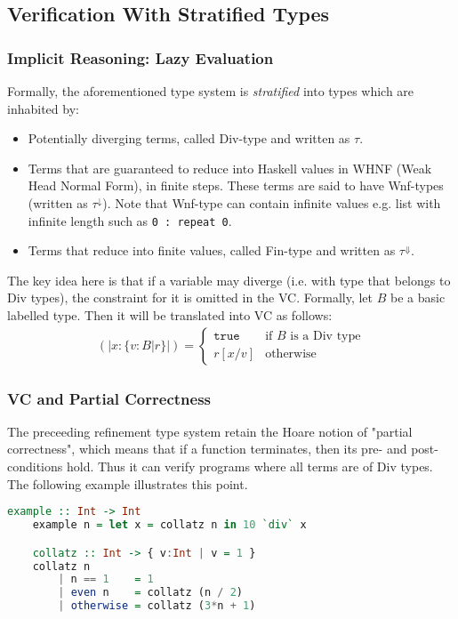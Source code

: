 \documentclass[a4paper,UKenglish]{lipics-v2016}
\begin{document}
\subsection{Verification With Stratified Types}
\subsubsection{Implicit Reasoning: Lazy Evaluation}
Formally, the aforementioned type system is \emph{stratified} into types which
are inhabited by:
\begin{itemize}
    \item Potentially diverging terms, called Div-type and written as $\tau$.
    \item Terms that are guaranteed to reduce into Haskell values in WHNF (Weak
        Head Normal Form), in finite steps.  These terms are said to have
        Wnf-types (written as $\tau^{\downarrow}$).  Note that Wnf-type can
        contain infinite values e.g. list with infinite length such as
        \texttt{0 : repeat 0}.
    \item Terms that reduce into finite values, called Fin-type and written as
        $\tau^{\Downarrow}$.
\end{itemize}
The key idea here is that if a variable may diverge (i.e. with type that
belongs to Div types), the constraint for it is omitted in the VC.  Formally,
let $B$ be a basic labelled type.  Then it will be translated into VC as
follows:
\begin{align}
    (|x:\{v:B|r\}|)=
    \left\{
        \begin{array}{ll}
            \texttt{true}&\mbox{if }B\mbox{ is a Div type}\\
            r[x/v]&\mbox{otherwise}
        \end{array}
    \right.
\end{align}

\subsubsection{VC and Partial Correctness}
The preceeding refinement type system retain the Hoare notion of "partial
correctness", which means that if a function terminates, then its pre- and
post-conditions hold.  Thus it can verify programs where all terms are of Div
types.  The following example illustrates this point.
\begin{lstlisting}[caption={Partial Correctness},float,captionpos=t,label={list:partial-correctness},language=haskell,abovecaptionskip=-\medskipamount]
    example :: Int -> Int
    example n = let x = collatz n in 10 `div` x

    collatz :: Int -> { v:Int | v = 1 }
    collatz n
        | n == 1    = 1
        | even n    = collatz (n / 2)
        | otherwise = collatz (3*n + 1)
\end{lstlisting}
\end{document}

